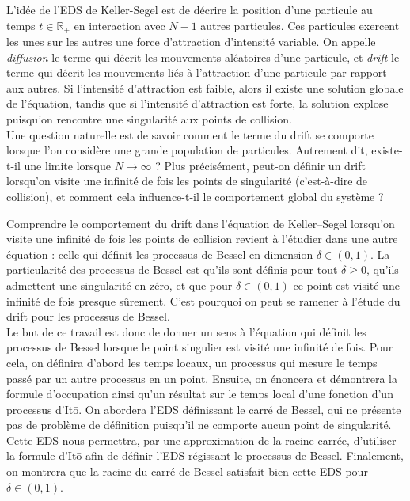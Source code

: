 \documentclass[openany]{book}
\newcommand{\R}{\mathbb{R}}
\newcommand{\1}{\mathbbm{1}}
\theoremstyle{thmfont}
\theoremstyle{deffont}
\theoremstyle{thmfont}
\theoremstyle{deffont}
\begin{document}
{L’idée de l’EDS de Keller-Segel est de décrire la position d’une particule au temps $t \in \R_+$ en interaction avec $N-1$ autres particules. Ces particules exercent les unes sur les autres une force d’attraction d’intensité variable. On appelle \emph{diffusion} le terme qui décrit les mouvements aléatoires d’une particule, et \emph{drift} le terme qui décrit les mouvements liés à l’attraction d’une particule par rapport aux autres. Si l’intensité d’attraction est faible, alors il existe une solution globale de l’équation, tandis que si l’intensité d’attraction est forte, la solution explose puisqu’on rencontre une singularité aux points de collision.\\


Une question naturelle est de savoir comment le terme du drift se comporte lorsque l’on considère une grande population de particules. Autrement dit, existe-t-il une limite lorsque $N \to \infty$ ? Plus précisément, peut-on définir un drift lorsqu’on visite une infinité de fois les points de singularité (c’est-à-dire de collision), et comment cela influence-t-il le comportement global du système ?

Comprendre le comportement du drift dans l’équation de Keller--Segel lorsqu’on visite une infinité de fois les points de collision revient à l’étudier dans une autre équation : celle qui définit les processus de Bessel en dimension $\delta \in (0,1)$. La particularité des processus de Bessel est qu’ils sont définis pour tout $\delta \geq 0$, qu’ils admettent une singularité en zéro, et que pour $\delta \in (0,1)$ ce point est visité une infinité de fois presque sûrement. C’est pourquoi on peut se ramener à l’étude du drift pour les processus de Bessel.\\


Le but de ce travail est donc de donner un sens à l’équation qui définit les processus de Bessel lorsque le point singulier est visité une infinité de fois. Pour cela, on définira d’abord les temps locaux, un processus qui mesure le temps passé par un autre processus en un point. Ensuite, on énoncera et démontrera la formule d’occupation ainsi qu’un résultat sur le temps local d’une fonction d'un processus d’Itō. On abordera l’EDS définissant le carré de Bessel, qui ne présente pas de problème de définition puisqu’il ne comporte aucun point de singularité. Cette EDS nous permettra, par une approximation de la racine carrée, d’utiliser la formule d’Itō afin de définir l’EDS régissant le processus de Bessel. Finalement, on montrera que la racine du carré de Bessel satisfait bien cette EDS pour $\delta \in (0,1)$.\\

}
\end{document}

